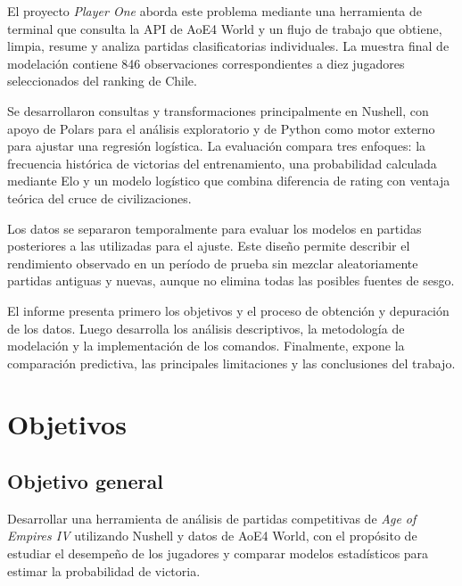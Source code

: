 \documentclass[12pt,a4paper]{article}
\begin{document}
El proyecto \textit{Player One} aborda este problema mediante una herramienta de terminal que consulta la API de AoE4 World y un flujo de trabajo que obtiene, limpia, resume y analiza partidas clasificatorias individuales. La muestra final de modelación contiene 846 observaciones correspondientes a diez jugadores seleccionados del ranking de Chile.

Se desarrollaron consultas y transformaciones principalmente en Nushell, con apoyo de Polars para el análisis exploratorio y de Python como motor externo para ajustar una regresión logística. La evaluación compara tres enfoques: la frecuencia histórica de victorias del entrenamiento, una probabilidad calculada mediante Elo y un modelo logístico que combina diferencia de rating con ventaja teórica del cruce de civilizaciones.

Los datos se separaron temporalmente para evaluar los modelos en partidas posteriores a las utilizadas para el ajuste. Este diseño permite describir el rendimiento observado en un período de prueba sin mezclar aleatoriamente partidas antiguas y nuevas, aunque no elimina todas las posibles fuentes de sesgo.

El informe presenta primero los objetivos y el proceso de obtención y depuración de los datos. Luego desarrolla los análisis descriptivos, la metodología de modelación y la implementación de los comandos. Finalmente, expone la comparación predictiva, las principales limitaciones y las conclusiones del trabajo.

\section{Objetivos}
\subsection{Objetivo general}
Desarrollar una herramienta de análisis de partidas competitivas de \textit{Age of Empires IV} utilizando Nushell y datos de AoE4 World, con el propósito de estudiar el desempeño de los jugadores y comparar modelos estadísticos para estimar la probabilidad de victoria.
\end{document}
